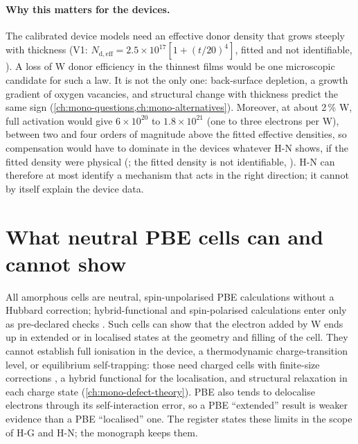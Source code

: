 \paragraph{Why this matters for the devices.} The calibrated device models need an effective donor density that grows
steeply with thickness (V1: $N_{\mathrm{d,eff}} = 2.5\times10^{17}[1+(t/20)^4]$\cmcu{}, fitted and not identifiable,
). A loss of W donor efficiency in the thinnest films would be one microscopic candidate for such a law.
It is not the only one: back-surface depletion, a growth gradient of oxygen vacancies, and structural change with
thickness predict the same sign (\cref{ch:mono-questions,ch:mono-alternatives}). Moreover, at about 2\,\% W, full
activation would give $6\times10^{20}$ to $1.8\times10^{21}$\cmcu{} (one to three electrons per W), between two and four
orders of magnitude above the fitted effective densities, so compensation would have to dominate in the devices whatever H-N shows, if the fitted density were physical
(; the fitted density is not identifiable, ). H-N can therefore at most identify a
mechanism that acts in the right direction; it cannot by itself explain the device data.

\section{What neutral PBE cells can and cannot show}
\label{sec:mono-am-scope}

All amorphous cells are neutral, spin-unpolarised PBE calculations without a Hubbard correction; hybrid-functional and
spin-polarised calculations enter only as pre-declared checks  . Such cells can show that the
electron added by W ends up in extended or in localised states at the geometry and filling of the cell. They cannot
establish full ionisation in the device, a thermodynamic charge-transition level, or equilibrium self-trapping: those
need charged cells with finite-size corrections \citep{Freysoldt2014,Lany2008}, a hybrid functional for the
localisation, and structural relaxation in each charge state (\cref{ch:mono-defect-theory}). PBE also tends to
delocalise electrons through its self-interaction error, so a PBE ``extended'' result is weaker evidence than a PBE
``localised'' one. The register states these limits in the scope of H-G and H-N; the monograph keeps them.

